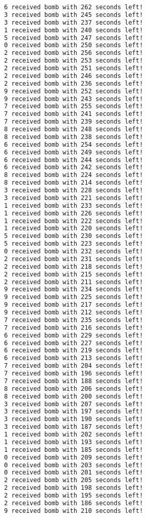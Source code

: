 \documentclass{article}
\begin{document}
\begin{lstlisting}[language=bash]
6 received bomb with 262 seconds left!
3 received bomb with 245 seconds left!
3 received bomb with 237 seconds left!
1 received bomb with 240 seconds left!
5 received bomb with 247 seconds left!
0 received bomb with 250 seconds left!
2 received bomb with 256 seconds left!
2 received bomb with 253 seconds left!
2 received bomb with 251 seconds left!
2 received bomb with 246 seconds left!
2 received bomb with 236 seconds left!
9 received bomb with 252 seconds left!
9 received bomb with 243 seconds left!
7 received bomb with 255 seconds left!
7 received bomb with 241 seconds left!
7 received bomb with 239 seconds left!
8 received bomb with 248 seconds left!
8 received bomb with 238 seconds left!
6 received bomb with 254 seconds left!
6 received bomb with 249 seconds left!
6 received bomb with 244 seconds left!
6 received bomb with 242 seconds left!
8 received bomb with 224 seconds left!
8 received bomb with 214 seconds left!
3 received bomb with 228 seconds left!
3 received bomb with 221 seconds left!
1 received bomb with 233 seconds left!
1 received bomb with 226 seconds left!
1 received bomb with 222 seconds left!
1 received bomb with 220 seconds left!
5 received bomb with 230 seconds left!
5 received bomb with 223 seconds left!
0 received bomb with 232 seconds left!
2 received bomb with 231 seconds left!
2 received bomb with 218 seconds left!
2 received bomb with 215 seconds left!
2 received bomb with 211 seconds left!
9 received bomb with 234 seconds left!
9 received bomb with 225 seconds left!
9 received bomb with 217 seconds left!
9 received bomb with 212 seconds left!
7 received bomb with 235 seconds left!
7 received bomb with 216 seconds left!
6 received bomb with 229 seconds left!
6 received bomb with 227 seconds left!
6 received bomb with 219 seconds left!
6 received bomb with 213 seconds left!
7 received bomb with 204 seconds left!
7 received bomb with 196 seconds left!
7 received bomb with 188 seconds left!
8 received bomb with 206 seconds left!
8 received bomb with 200 seconds left!
3 received bomb with 207 seconds left!
3 received bomb with 197 seconds left!
3 received bomb with 190 seconds left!
3 received bomb with 187 seconds left!
1 received bomb with 202 seconds left!
1 received bomb with 193 seconds left!
1 received bomb with 185 seconds left!
0 received bomb with 209 seconds left!
0 received bomb with 203 seconds left!
0 received bomb with 201 seconds left!
2 received bomb with 205 seconds left!
2 received bomb with 198 seconds left!
2 received bomb with 195 seconds left!
2 received bomb with 186 seconds left!
9 received bomb with 210 seconds left!

\end{lstlisting}
\end{document}
